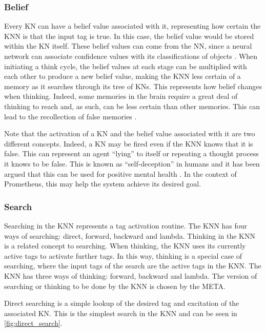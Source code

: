 \documentclass[titlepage,11pt]{article}
\begin{document}
\subsubsection{Belief}
\label{sec:background_knn_belief}

Every KN can have a belief value associated with it, representing how certain the KNN is that the input tag is true. In this case, the belief value would be stored within the KN itself. These belief values can come from the NN, since a neural network can associate confidence values with its classifications of objects \cite{mitchell1997machine}. When initiating a think cycle, the belief values at each stage can be multiplied with each other to produce a new belief value, making the KNN less certain of a memory as it searches through its tree of KNs. This represents how belief changes when thinking. Indeed, some memories in the brain require a great deal of thinking to reach and, as such, can be less certain than other memories. This can lead to the recollection of false memories \cite{falsememories}.

Note that the activation of a KN and the belief value associated with it are two different concepts. Indeed, a KN may be fired even if the KNN knows that it is false. This can represent an agent ``lying'' to itself or repeating a thought process it knows to be false. This is known as ``self-deception'' in humans and it has been argued that this can be used for positive mental health \cite{taylor1989positive}. In the context of Prometheus, this may help the system achieve its desired goal.

\subsubsection{Search}
\label{sec:background_knn_search}

Searching in the KNN represents a tag activation routine. The KNN has four ways of searching: direct, forward, backward and lambda. Thinking in the KNN is a related concept to searching. When thinking, the KNN uses its currently active tags to activate further tags. In this way, thinking is a special case of searching, where the input tags of the search are the active tags in the KNN. The KNN has three ways of thinking: forward, backward and lambda. The version of searching or thinking to be done by the KNN is chosen by the META. 

Direct searching is a simple lookup of the desired tag and excitation of the associated KN. This is the simplest search in the KNN and can be seen in \cref{fig:direct_search}.
\end{document}
